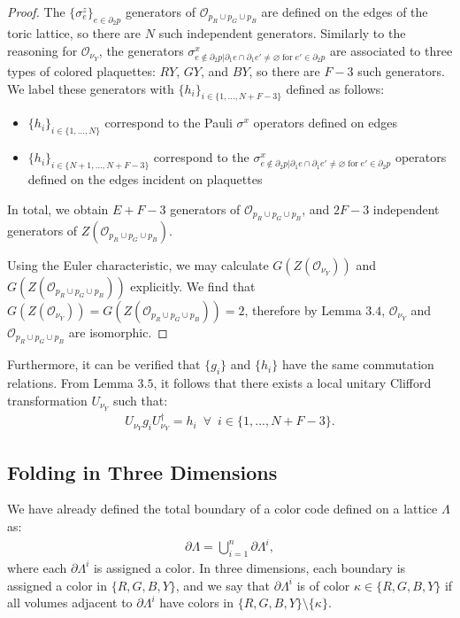 \documentclass[12pt]{article}
\let\emptyset\varnothing
\theoremstyle{definition}
\begin{document}
\begin{proof}
        The $\{\sigma^z_e\}_{e\in\partial_2p}$ generators of $\mathcal{O}_{p_R\cup p_G\cup p_B}$ are defined on the edges of the toric lattice, so there are $N$ such independent generators. Similarly to the reasoning for $\mathcal{O}_{\nu_Y}$, the generators $\sigma^x_{e\notin\partial_2p|\partial_1e\cap\partial_1e'\neq\emptyset\;\text{for}\; e'\in\partial_2p}$ are associated to three types of colored plaquettes: $RY$, $GY$, and $BY$, so there are $F-3$ such generators. We label these generators with $\{h_i\}_{i\in\{1,...,N+F-3\}}$ defined as follows:
            \begin{itemize}
                \item $\{h_i\}_{i\in\{1,...,N\}}$ correspond to the Pauli $\sigma^x$ operators defined on edges
                \item $\{h_i\}_{i\in\{N+1,...,N+F-3\}}$ correspond to the $\sigma^x_{e\notin\partial_2p|\partial_1e\cap\partial_1e'\neq\emptyset\;\text{for}\; e'\in\partial_2p}$ operators defined on the edges incident on plaquettes 
            \end{itemize}
        In total, we obtain $E+F-3$ generators of $\mathcal{O}_{p_R\cup p_G\cup p_B}$, and $2F-3$ independent generators of $Z(\mathcal{O}_{p_R\cup p_G\cup p_B})$.

        Using the Euler characteristic, we may calculate $G(Z(\mathcal{O}_{\nu_Y}))$ and $G(Z(\mathcal{O}_{p_R\cup p_G\cup p_B}))$ explicitly. We find that $G(Z(\mathcal{O}_{\nu_Y})) = G(Z(\mathcal{O}_{p_R\cup p_G\cup p_B})) = 2$, therefore by Lemma $3.4$, $\mathcal{O}_{\nu_Y}$ and $\mathcal{O}_{p_R\cup p_G\cup p_B}$ are isomorphic.
    \end{proof}
Furthermore, it can be verified that $\{g_i\}$ and $\{h_i\}$ have the same commutation relations. From Lemma $3.5$, it follows that there exists a local unitary Clifford transformation $U_{\nu_Y}$ such that:
            \begin{align}
                U_{\nu_Y} g_iU^\dagger_{\nu_Y} = h_i\enspace\forall\enspace i\in\{1,...,N+F-3\}.
            \end{align}

\subsection{Folding in Three Dimensions}
We have already defined the total boundary of a color code defined on a lattice $\Lambda$ as:
    \begin{align}
        \partial\Lambda = \bigcup^n_{i = 1}\partial\Lambda^i ,
    \end{align}
where each $\partial\Lambda^i$ is assigned a color. In three dimensions, each boundary is assigned a color in $\{R,G,B,Y\}$, and we say that $\partial\Lambda^i$ is of color $\kappa\in\{R,G,B,Y\}$ if all volumes adjacent to $\partial\Lambda^i$ have colors in $\{R,G,B,Y\}\setminus\{\kappa\}$.\newline
\end{document}
